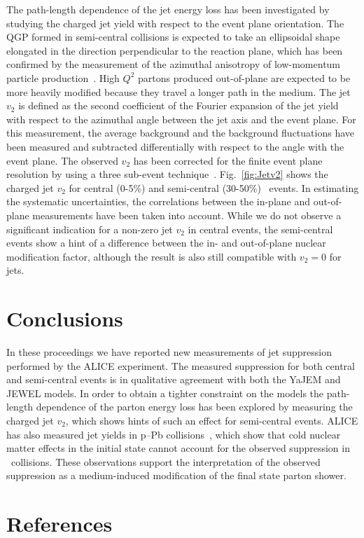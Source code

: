 \documentclass[3p,times]{simplearticle}
\begin{document}
The path-length dependence of the jet energy loss has been investigated by studying the charged jet yield with respect to the 
event plane orientation. The QGP formed in semi-central collisions is expected to take an ellipsoidal shape elongated in the direction
perpendicular to the reaction plane, 
which has been confirmed by the measurement
of the azimuthal anisotropy of low-momentum particle production~\cite{ALICE:2010b}. 
High $Q^2$ partons produced out-of-plane are expected to be more heavily modified because
they travel a longer path in the medium. The jet $v_2$ is defined as the second coefficient 
of the Fourier expansion of the jet yield with respect
to the azimuthal angle between the jet axis and the event plane.
For this measurement,
the average background and the background fluctuations have been measured and subtracted differentially with respect to 
the angle with the event plane. The observed $v_2$ has been corrected for the finite event plane resolution
by using a three sub-event technique~\cite{Poskanzer:1998}. Fig.~\ref{fig:Jetv2} shows the charged jet $v_2$
for central (0-5\%) and semi-central (30-50\%) \PbPb\ events. 
In estimating the systematic uncertainties, the correlations between the in-plane and out-of-plane measurements have been taken into account.
While we do not observe a significant indication for a non-zero jet $v_2$ in central events, the semi-central events show 
a hint of a difference between the in- and out-of-plane nuclear modification factor, 
although the result is also still compatible with $v_2=0$ for jets.
%
\section{Conclusions}
%
In these proceedings we have reported new measurements of jet suppression performed by the ALICE experiment.
The measured suppression for both central and semi-central events is in qualitative agreement with both the YaJEM and JEWEL models.
In order to obtain a tighter constraint on the models the path-length dependence of the parton energy loss has been
explored by measuring the charged jet $v_2$, which shows hints of such an effect for semi-central events.
ALICE has also measured jet yields in p--Pb collisions~\cite{Haake:2013, Connors:2014}, which show that cold nuclear matter effects in
the initial state cannot account for the observed suppression in \PbPb\ collisions. These observations support the
interpretation of the observed suppression as a medium-induced modification of the final state parton shower.
\ifarxiv

\section*{References}

\else


\fi


%
\end{document}
